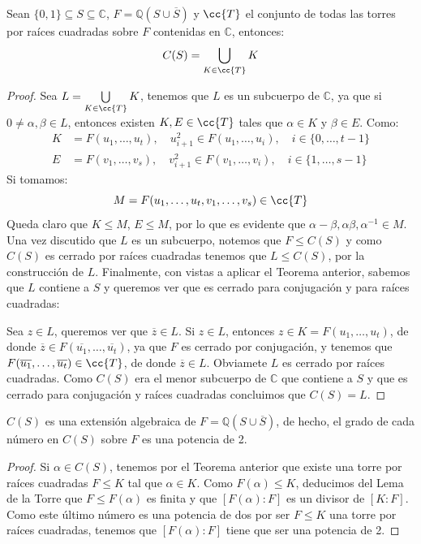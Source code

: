 \begin{teo}\label{teo:torres_raices}
    Sean $\{0,1\}\subseteq S\subseteq \mathbb{C}$, $F = \mathbb{Q}(S\cup \overline{S})$ y $\cc{T}$ el conjunto de todas las torres por raíces cuadradas sobre $F$ contenidas en $\mathbb{C}$, entonces:
    \begin{equation*}
        C(S) = \bigcup_{K\in \cc{T}}K
    \end{equation*}
    \begin{proof}
        Sea $L = \bigcup\limits_{K\in \cc{T}}K$, tenemos que $L$ es un subcuerpo de $\mathbb{C}$, ya que si $0\neq\alpha,\beta\in L$, entonces existen $K,E\in \cc{T}$ tales que $\alpha\in K$ y $\beta\in E$. Como:
        \begin{align*}
            K &= F(u_1, \ldots, u_t),\quad  u_{i+1}^2 \in F(u_1, \ldots, u_i), \quad i \in \{0,\ldots,t-1\} \\
            E &= F(v_1, \ldots, v_s),\quad  v_{i+1}^2 \in F(v_1, \ldots, v_i), \quad i \in \{1,\ldots, s-1\}
        \end{align*}
        Si tomamos:
        \begin{equation*}
            M = F(u_1,\ldots,u_t, v_1,\ldots,v_s) \in \cc{T}
        \end{equation*}
        Queda claro que $K\leq M$, $E\leq M$, por lo que es evidente que $\alpha-\beta,\alpha\beta, \alpha^{-1}\in M$.\\

        \noindent
        Una vez discutido que $L$ es un subcuerpo, notemos que $F\leq C(S)$ y como $C(S)$ es cerrado por raíces cuadradas tenemos que $L\leq C(S)$, por la construcción de $L$. Finalmente, con vistas a aplicar el Teorema anterior, sabemos que $L$ contiene a $S$ y queremos ver que es cerrado para conjugación y para raíces cuadradas:

        Sea $z\in L$, queremos ver que $\overline{z}\in L$. Si $z\in L$, entonces $z\in K=F(u_1,\ldots,u_t)$, de donde $\overline{z}\in F(\overline{u_1},\ldots,\overline{u_t})$, ya que $F$ es cerrado por conjugación, y tenemos que $F(\overline{u_1},\ldots,\overline{u_t})\in \cc{T}$, de donde $\overline{z}\in L$. Obviamete $L$ es cerrado por raíces cuadradas. Como $C(S)$ era el menor subcuerpo de $\mathbb{C}$ que contiene a $S$ y que es cerrado para conjugación y raíces cuadradas concluimos que $C(S) = L$.
    \end{proof}
\end{teo}

\begin{coro}
    $C(S)$ es una extensión algebraica de $F=\mathbb{Q}(S\cup \overline{S})$, de hecho, el grado de cada número en $C(S)$ sobre $F$ es una potencia de 2. 
    \begin{proof}
        Si $\alpha \in C(S)$, tenemos por el Teorema anterior que existe una torre por raíces cuadradas $F\leq K$ tal que $\alpha \in K$. Como $F(\alpha)\leq K$, deducimos del Lema de la Torre que $F\leq F(\alpha)$ es finita y que $[F(\alpha):F]$ es un divisor de $[K:F]$. Como este último número es una potencia de dos por ser $F\leq K$ una torre por raíces cuadradas, tenemos que $[F(\alpha):F]$ tiene que ser una potencia de 2.
    \end{proof}
\end{coro}

